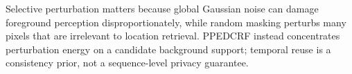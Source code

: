 \documentclass[10pt,journal]{IEEEtran}
\begin{document}
Selective perturbation matters because global Gaussian noise can damage foreground perception disproportionately, while random masking perturbs many pixels that are irrelevant to location retrieval. PPEDCRF instead concentrates perturbation energy on a candidate background support; temporal reuse is a consistency prior, not a sequence-level privacy guarantee.

\end{document}
